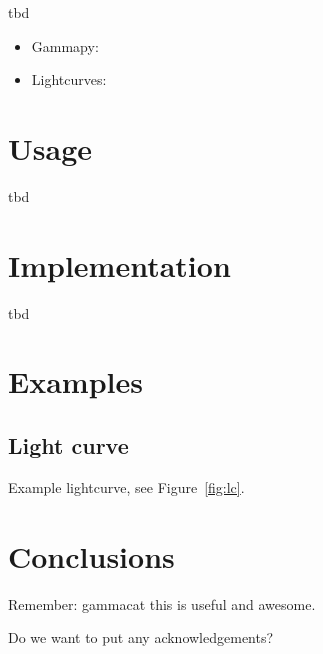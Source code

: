 \documentclass[11pt,twoside]{article}
\begin{document}
tbd

\begin{itemize}
\item Gammapy: \citep{gammapy}
\item Lightcurves: \citep{lc}
\end{itemize}

\section{Usage}

tbd

\section{Implementation}

tbd

\section{Examples}

\subsection{Light curve}

Example lightcurve, see Figure~\ref{fig:lc}.


\section{Conclusions}

Remember: gammacat this is useful and awesome.


\acknowledgements Do we want to put any acknowledgements?


\end{document}
